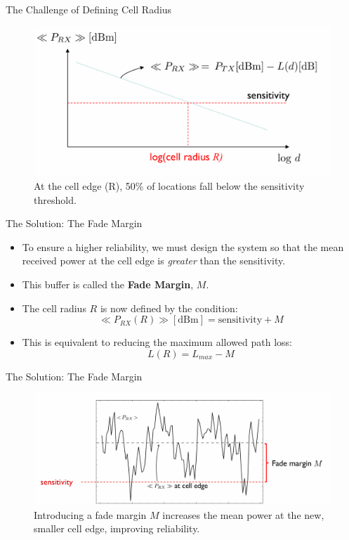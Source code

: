 \documentclass{beamer}
\begin{document}
	\begin{frame}{The Challenge of Defining Cell Radius}
		\begin{figure}
			\centering
			\includegraphics[width=0.9\linewidth]{"pictures/50-percent-problem-2.png"}
			\caption{At the cell edge (R), 50\% of locations fall below the sensitivity threshold.}
		\end{figure}
	\end{frame}
	
	\begin{frame}{The Solution: The Fade Margin}
		\begin{itemize}
			\item To ensure a higher reliability, we must design the system so that the mean received power at the cell edge is \textit{greater} than the sensitivity.
			\item This buffer is called the \textbf{Fade Margin}, $M$.
			\item The cell radius $R$ is now defined by the condition:
			\[ \ll P_{RX}(R) \gg[\text{dBm}] = \text{sensitivity} + M \]
			\item This is equivalent to reducing the maximum allowed path loss:
			\[ L(R) = L_{max} - M \]
		\end{itemize}
	\end{frame}
	
	\begin{frame}{The Solution: The Fade Margin}
		\begin{figure}
			\centering
			\includegraphics[width=0.9\linewidth]{"pictures/fade-margin-concept.png"}
			\caption{Introducing a fade margin $M$ increases the mean power at the new, smaller cell edge, improving reliability.}
		\end{figure}
	\end{frame}
	
\end{document}
